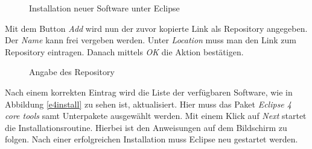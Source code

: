 \begin{figure}[H]
  \vspace{0.5cm}
  \centering
  \caption{Installation neuer Software unter Eclipse}
  \label{installnew}
  \vspace{0.5cm}
\end{figure}

Mit dem Button \textit{Add} wird nun der zuvor kopierte Link als Repository angegeben. Der \textit{Name} kann frei vergeben werden. Unter \textit{Location} muss man den Link zum Repository eintragen. Danach mittels \textit{OK} die Aktion bestätigen.

\begin{figure}[H]
  \vspace{0.5cm}
  \centering
  \caption{Angabe des Repository}
  \label{insertrepo}
  \vspace{0.5cm}
\end{figure}

Nach einem korrekten Eintrag wird die Liste der verfügbaren Software, wie in Abbildung \ref{e4install} zu sehen ist, aktualisiert. Hier muss das Paket \textit{Eclipse 4 core tools} samt Unterpakete ausgewählt werden. Mit einem Klick auf \textit{Next} startet die Installationsroutine. Hierbei ist den Anweisungen auf dem Bildschirm zu folgen. Nach einer erfolgreichen Installation muss Eclipse neu gestartet werden.

